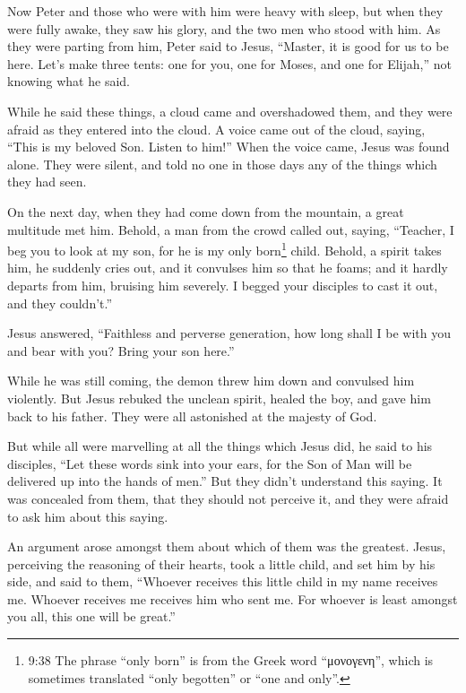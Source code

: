  Now Peter and those who were with him were heavy with
sleep, but when they were fully awake, they saw his glory, and the two
men who stood with him.  As they were parting from him,
Peter said to Jesus, ``Master, it is good for us to be here. Let's make
three tents: one for you, one for Moses, and one for Elijah,'' not
knowing what he said.

 While he said these things, a cloud came and overshadowed
them, and they were afraid as they entered into the cloud. 
A voice came out of the cloud, saying, ``This is my beloved Son. Listen
to him!''  When the voice came, Jesus was found alone. They
were silent, and told no one in those days any of the things which they
had seen.

 On the next day, when they had come down from the
mountain, a great multitude met him.  Behold, a man from
the crowd called out, saying, ``Teacher, I beg you to look at my son,
for he is my only born\footnote{9:38 The phrase ``only born'' is from
  the Greek word ``μονογενη'', which is sometimes translated ``only
  begotten'' or ``one and only''.} child.  Behold, a spirit
takes him, he suddenly cries out, and it convulses him so that he foams;
and it hardly departs from him, bruising him severely.  I
begged your disciples to cast it out, and they couldn't.''

 Jesus answered, ``Faithless and perverse generation, how
long shall I be with you and bear with you? Bring your son here.''

 While he was still coming, the demon threw him down and
convulsed him violently. But Jesus rebuked the unclean spirit, healed
the boy, and gave him back to his father.  They were all
astonished at the majesty of God.

But while all were marvelling at all the things which Jesus did, he said
to his disciples,  ``Let these words sink into your ears,
for the Son of Man will be delivered up into the hands of men.''
 But they didn't understand this saying. It was concealed
from them, that they should not perceive it, and they were afraid to ask
him about this saying.

 An argument arose amongst them about which of them was the
greatest.  Jesus, perceiving the reasoning of their hearts,
took a little child, and set him by his side,  and said to
them, ``Whoever receives this little child in my name receives me.
Whoever receives me receives him who sent me. For whoever is least
amongst you all, this one will be great.''

